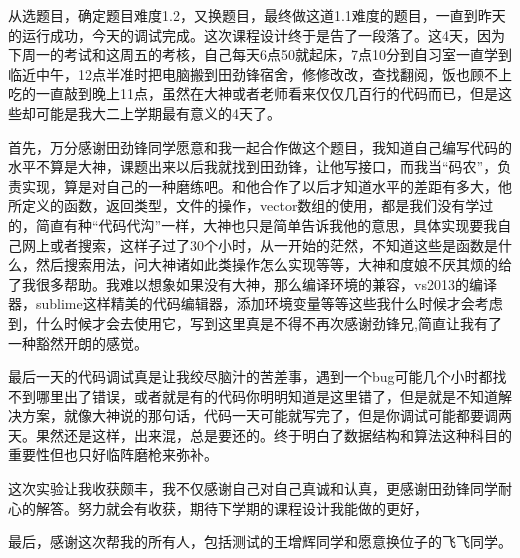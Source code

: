 从选题目，确定题目难度1.2，又换题目，最终做这道1.1难度的题目，一直到昨天的运行成功，今天的调试完成。这次课程设计终于是告了一段落了。这4天，因为下周一的考试和这周五的考核，自己每天6点50就起床，7点10分到自习室一直学到临近中午，12点半准时把电脑搬到田劲锋宿舍，修修改改，查找翻阅，饭也顾不上吃的一直敲到晚上11点，虽然在大神或者老师看来仅仅几百行的代码而已，但是这些却可能是我大二上学期最有意义的4天了。

首先，万分感谢田劲锋同学愿意和我一起合作做这个题目，我知道自己编写代码的水平不算是大神，课题出来以后我就找到田劲锋，让他写接口，而我当“码农”，负责实现，算是对自己的一种磨练吧。和他合作了以后才知道水平的差距有多大，他所定义的函数，返回类型，文件的操作，vector数组的使用，都是我们没有学过的，简直有种“代码代沟”一样，大神也只是简单告诉我他的意思，具体实现要我自己网上或者搜索，这样子过了30个小时，从一开始的茫然，不知道这些是函数是什么，然后搜索用法，问大神诸如此类操作怎么实现等等，大神和度娘不厌其烦的给了我很多帮助。我难以想象如果没有大神，那么编译环境的兼容，vs2013的编译器，sublime这样精美的代码编辑器，添加环境变量等等这些我什么时候才会考虑到，什么时候才会去使用它，写到这里真是不得不再次感谢劲锋兄,简直让我有了一种豁然开朗的感觉。

最后一天的代码调试真是让我绞尽脑汁的苦差事，遇到一个bug可能几个小时都找不到哪里出了错误，或者就是有的代码你明明知道是这里错了，但是就是不知道解决方案，就像大神说的那句话，代码一天可能就写完了，但是你调试可能都要调两天。果然还是这样，出来混，总是要还的。终于明白了数据结构和算法这种科目的重要性但也只好临阵磨枪来弥补。

这次实验让我收获颇丰，我不仅感谢自己对自己真诚和认真，更感谢田劲锋同学耐心的解答。努力就会有收获，期待下学期的课程设计我能做的更好，

最后，感谢这次帮我的所有人，包括测试的王增辉同学和愿意换位子的飞飞同学。
